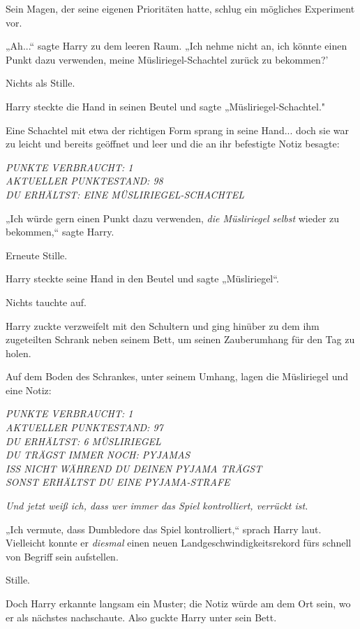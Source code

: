 {Sein Magen, der seine eigenen Prioritäten hatte, schlug ein mögliches Experiment vor.

„Ah...“ sagte Harry zu dem leeren Raum. „Ich nehme nicht an, ich könnte einen Punkt dazu verwenden, meine Müsliriegel-Schachtel zurück zu bekommen?'

Nichts als Stille.

Harry steckte die Hand in seinen Beutel und sagte „Müsliriegel-Schachtel."

Eine Schachtel mit etwa der richtigen Form sprang in seine Hand... doch sie war zu leicht und bereits geöffnet und leer und die an ihr befestigte Notiz besagte:

\emph{PUNKTE VERBRAUCHT: 1\\ AKTUELLER PUNKTESTAND: 98\\ DU ERHÄLTST: EINE MÜSLIRIEGEL-SCHACHTEL}

„Ich würde gern einen Punkt dazu verwenden, \emph{die Müsliriegel selbst} wieder zu bekommen,“ sagte Harry.

Erneute Stille.

Harry steckte seine Hand in den Beutel und sagte „Müsliriegel“.

Nichts tauchte auf.

Harry zuckte verzweifelt mit den Schultern und ging hinüber zu dem ihm zugeteilten Schrank neben seinem Bett, um seinen Zauberumhang für den Tag zu holen.

Auf dem Boden des Schrankes, unter seinem Umhang, lagen die Müsliriegel und eine Notiz:

\emph{PUNKTE VERBRAUCHT: 1\\ AKTUELLER PUNKTESTAND: 97\\ DU ERHÄLTST: 6 MÜSLIRIEGEL\\ DU TRÄGST IMMER NOCH: PYJAMAS\\ ISS NICHT WÄHREND DU DEINEN} \emph{PYJAMA TRÄGST\\ SONST ERHÄLTST DU EINE PYJAMA-STRAFE}

\emph{Und jetzt weiß ich, dass wer immer das Spiel kontrolliert, verrückt ist.}

„Ich vermute, dass Dumbledore das Spiel kontrolliert,“ sprach Harry laut. Vielleicht konnte er \emph{diesmal} einen neuen Landgeschwindigkeitsrekord fürs schnell von Begriff sein aufstellen.

Stille.

Doch Harry erkannte langsam ein Muster; die Notiz würde am dem Ort sein, wo er als nächstes nachschaute. Also guckte Harry unter sein Bett.

}
